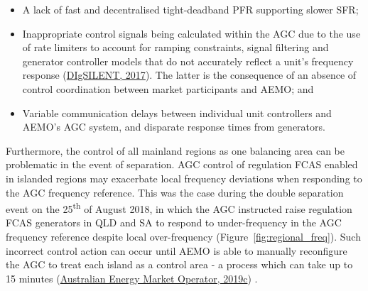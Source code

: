 \documentclass[12pt,a4paper,]{report}
\providecommand{\tightlist}{%
  \setlength{\itemsep}{0pt}\setlength{\parskip}{0pt}}
\begin{document}
\begin{itemize}
\tightlist
\item
  A lack of fast and decentralised tight-deadband PFR supporting slower
  SFR;
\item
  Inappropriate control signals being calculated within the AGC due to
  the use of rate limiters to account for ramping constraints, signal
  filtering and generator controller models that do not accurately
  reflect a unit's frequency response
  (\protect\hyperlink{ref-digsilentReviewFrequencyControl2017}{DIgSILENT,
  2017}). The latter is the consequence of an absence of control
  coordination between market participants and AEMO; and
\item
  Variable communication delays between individual unit controllers and
  AEMO's AGC system, and disparate response times from generators.
\end{itemize}

Furthermore, the control of all mainland regions as one balancing area
can be problematic in the event of separation. AGC control of regulation
FCAS enabled in islanded regions may exacerbate local frequency
deviations when responding to the AGC frequency reference. This was the
case during the double separation event on the 25\textsuperscript{th} of
August 2018, in which the AGC instructed raise regulation FCAS
generators in QLD and SA to respond to under-frequency in the AGC
frequency reference despite local over-frequency
(Figure~\ref{fig:regional_freq}). Such incorrect control action can
occur until AEMO is able to manually reconfigure the AGC to treat each
island as a control area - a process which can take up to 15 minutes
(\protect\hyperlink{ref-australianenergymarketoperatorFinalReportQueensland2019}{Australian
Energy Market Operator, 2019c}) .
\end{document}
